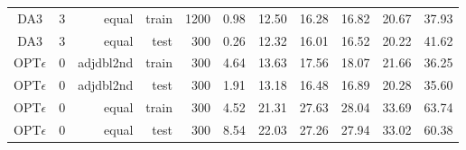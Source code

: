 \begin{table*}[t]
\begin{minipage}{\textwidth}
\begin{tabular}{c@{}rrrrrrrrrr}
  DA3 & 3 & equal & train & 1200 & 0.98 & 12.50 & 16.28 & 16.82 & 20.67 & 37.93 \\ 
  DA3 & 3 & equal & test & 300 & 0.26 & 12.32 & 16.01 & 16.52 & 20.22 & 41.62 \\ 
  \midrule
  OPT$\epsilon$ & 0 & adjdbl2nd & train & 300 & 4.64 & 13.63 & 17.56 & 18.07 & 21.66 & 36.25 \\ 
  OPT$\epsilon$ & 0 & adjdbl2nd & test & 300 & 1.91 & 13.18 & 16.48 & 16.89 & 20.28 & 35.60 \\ 
  OPT$\epsilon$ & 0 & equal & train & 300 & 4.52 & 21.31 & 27.63 & 28.04 & 33.69 & 63.74 \\ 
  OPT$\epsilon$ & 0 & equal & test & 300 & 8.54 & 22.03 & 27.26 & 27.94 & 33.02 
  & 60.38 \\ 
  \bottomrule
\end{tabular}
\end{minipage}
\end{table*}